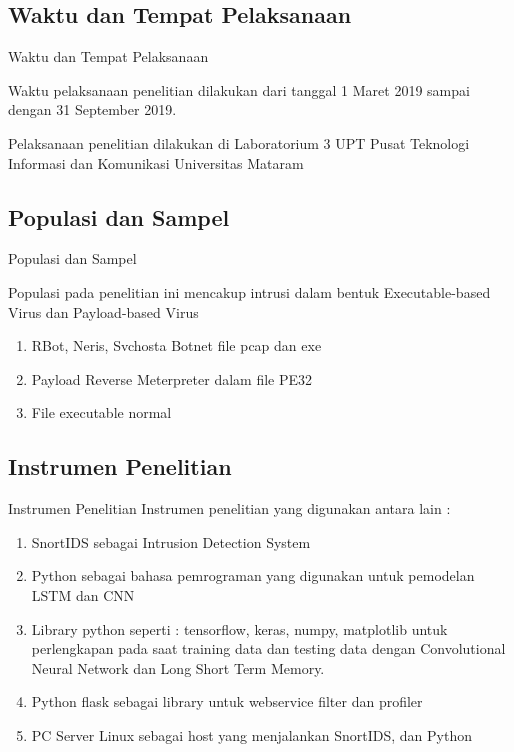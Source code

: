 \documentclass[t]{beamer}
\begin{document}
\subsection{Waktu dan Tempat Pelaksanaan}
\begin{frame}{Waktu dan Tempat Pelaksanaan}
	\par Waktu pelaksanaan penelitian dilakukan dari tanggal 1 Maret 2019 sampai dengan 31 September 2019.
	\par Pelaksanaan penelitian dilakukan di Laboratorium 3 UPT Pusat Teknologi Informasi dan Komunikasi Universitas Mataram
\end{frame}
\subsection{Populasi dan Sampel}
\begin{frame}{Populasi dan Sampel}
	\par Populasi pada penelitian ini mencakup intrusi dalam bentuk Executable-based Virus dan Payload-based Virus
	\begin{enumerate}
		\item RBot, Neris, Svchosta Botnet file pcap dan exe
		\item Payload Reverse Meterpreter dalam file PE32
		\item File executable normal
	\end{enumerate}
\end{frame}
\subsection{Instrumen Penelitian}
\begin{frame}{Instrumen Penelitian}
	Instrumen penelitian yang digunakan antara lain :
	\begin{enumerate}
		\item SnortIDS sebagai Intrusion Detection System
		\item Python sebagai bahasa pemrograman yang digunakan untuk pemodelan LSTM dan CNN
		\item Library python seperti : tensorflow, keras, numpy, matplotlib untuk perlengkapan pada saat training data dan testing data dengan Convolutional Neural Network dan Long Short Term Memory.
		\item Python flask sebagai library untuk webservice filter dan profiler
		\item PC Server Linux sebagai host yang menjalankan SnortIDS, dan Python
	\end{enumerate}    
\end{frame}
\end{document}
